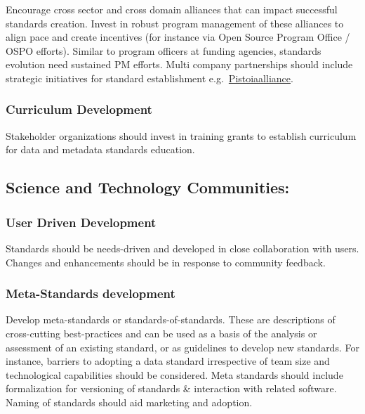 \documentclass[
  letterpaper,
  DIV=11,
  numbers=noendperiod]{scrartcl}
\begin{document}
Encourage cross sector and cross domain alliances that can impact
successful standards creation. Invest in robust program management of
these alliances to align pace and create incentives (for instance via
Open Source Program Office / OSPO efforts). Similar to program officers
at funding agencies, standards evolution need sustained PM efforts.
Multi company partnerships should include strategic initiatives for
standard establishment
e.g.~\href{https://www.pistoiaalliance.org/news/press-release-pistoia-alliance-launches-idmp-1-0/}{Pistoiaalliance}.

\subsubsection{Curriculum Development}\label{curriculum-development}

Stakeholder organizations should invest in training grants to establish
curriculum for data and metadata standards education.

\subsection{Science and Technology
Communities:}\label{science-and-technology-communities}

\subsubsection{User Driven Development}\label{user-driven-development}

Standards should be needs-driven and developed in close collaboration
with users. Changes and enhancements should be in response to community
feedback.

\subsubsection{Meta-Standards
development}\label{meta-standards-development}

Develop meta-standards or standards-of-standards. These are descriptions
of cross-cutting best-practices and can be used as a basis of the
analysis or assessment of an existing standard, or as guidelines to
develop new standards. For instance, barriers to adopting a data
standard irrespective of team size and technological capabilities should
be considered. Meta standards should include formalization for
versioning of standards \& interaction with related software. Naming of
standards should aid marketing and adoption.
\end{document}
